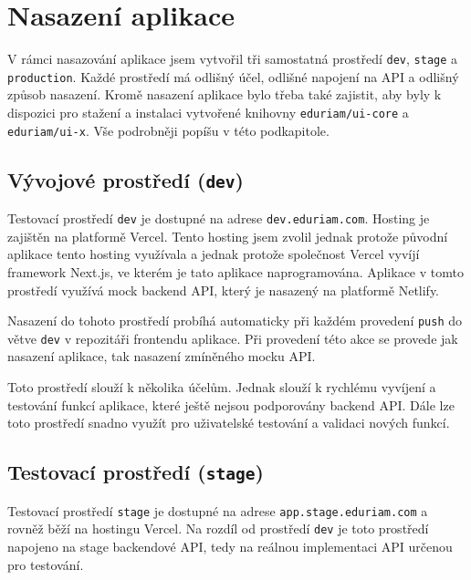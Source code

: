 \section{Nasazení aplikace}\label{sec:deployment}

V rámci nasazování aplikace jsem vytvořil tři samostatná prostředí \texttt{dev}, \texttt{stage} a \texttt{production}. Každé prostředí má odlišný účel, odlišné napojení na API a odlišný způsob nasazení. Kromě nasazení aplikace bylo třeba také zajistit, aby byly k dispozici pro stažení a instalaci vytvořené knihovny \texttt{eduriam/ui-core} a \texttt{eduriam/ui-x}. Vše podrobněji popíšu v této podkapitole.

\subsection{Vývojové prostředí (\texttt{dev})}

Testovací prostředí \texttt{dev} je dostupné na adrese \texttt{dev.eduriam.com}. Hosting je zajištěn na platformě Vercel. Tento hosting jsem zvolil jednak protože původní aplikace tento hosting využívala a jednak protože společnost Vercel vyvíjí framework Next.js, ve kterém je tato aplikace naprogramována. Aplikace v tomto prostředí využívá mock backend API, který je nasazený na platformě Netlify.

Nasazení do tohoto prostředí probíhá automaticky při každém provedení \texttt{push} do větve \texttt{dev} v repozitáři frontendu aplikace. Při provedení této akce se provede jak nasazení aplikace, tak nasazení zmíněného mocku API.

Toto prostředí slouží k několika účelům. Jednak slouží k rychlému vyvíjení a testování funkcí aplikace, které ještě nejsou podporovány backend API. Dále lze toto prostředí snadno využít pro uživatelské testování a validaci nových funkcí.

\subsection{Testovací prostředí (\texttt{stage})}

Testovací prostředí \texttt{stage} je dostupné na adrese \texttt{app.stage.eduriam.com} a rovněž běží na hostingu Vercel. Na rozdíl od prostředí \texttt{dev} je toto prostředí napojeno na stage backendové API, tedy na reálnou implementaci API určenou pro testování.

